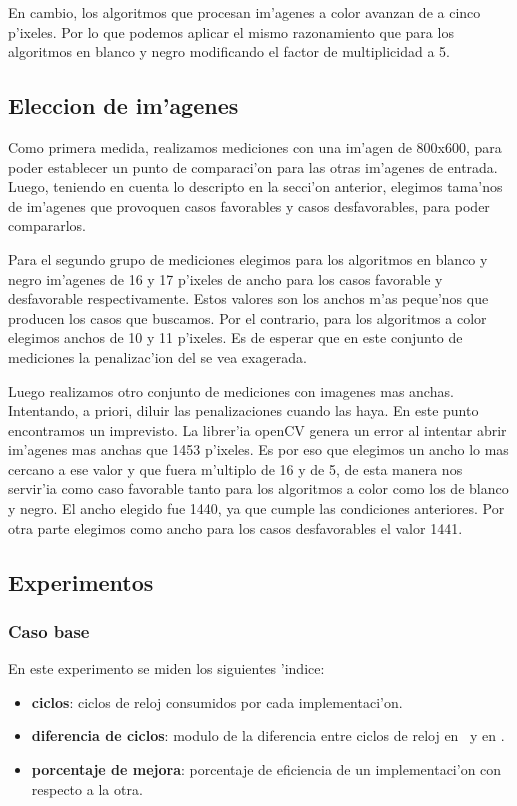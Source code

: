 En cambio, los algoritmos que procesan im'agenes a color avanzan de a cinco p'ixeles. Por lo que podemos aplicar el mismo razonamiento que para los algoritmos en blanco y negro modificando el factor de multiplicidad a 5.

\subsection{Eleccion de im'agenes}
Como primera medida, realizamos mediciones con una im'agen de 800x600, para poder establecer un punto de comparaci'on para las otras im'agenes de entrada. Luego, teniendo en cuenta lo descripto en la secci'on anterior, elegimos tama'nos de im'agenes que provoquen casos favorables y casos desfavorables, para poder compararlos. 

Para el segundo grupo de mediciones elegimos para los algoritmos en blanco y negro im'agenes de 16 y 17 p'ixeles de ancho para los casos favorable y desfavorable respectivamente. Estos valores son los anchos m'as peque'nos que producen los casos que buscamos. Por el contrario, para los algoritmos a color elegimos anchos de 10 y 11 p'ixeles. Es de esperar que en este conjunto de mediciones la penalizac'ion del \ass se vea exagerada.

Luego realizamos otro conjunto de mediciones con imagenes mas anchas. Intentando, a priori, diluir las penalizaciones cuando las haya. En este punto encontramos un imprevisto. La librer'ia openCV genera un error al intentar abrir im'agenes mas anchas que 1453 p'ixeles. Es por eso que elegimos un ancho lo mas cercano a ese valor y que fuera m'ultiplo de 16 y de 5, de esta manera nos servir'ia como caso favorable tanto para los algoritmos a color como los de blanco y negro. El ancho elegido fue 1440, ya que cumple las condiciones anteriores. Por otra parte elegimos como ancho para los casos desfavorables el valor 1441.


\subsection{Experimentos}
\subsubsection{Caso base}
En este experimento se miden los siguientes 'indice:
\begin{itemize}
 \item \textbf{ciclos}: ciclos de reloj consumidos por cada implementaci'on.
 \item \textbf{diferencia de ciclos}: modulo de la diferencia entre ciclos de reloj en \C \ y en \ass.
 \item \textbf{porcentaje de mejora}: porcentaje de eficiencia de un implementaci'on con respecto a la otra.
\end{itemize}

